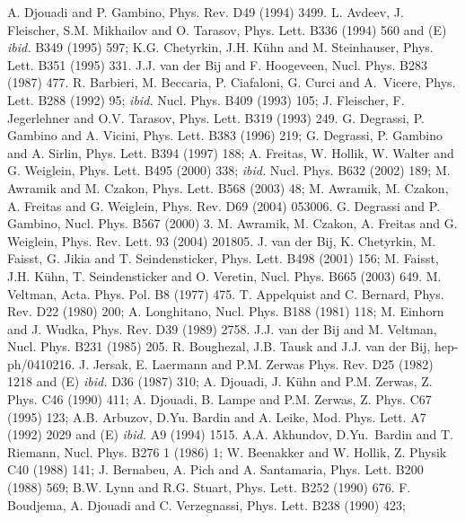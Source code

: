 \begin{thebibliography}{999}
A. Djouadi and P. Gambino, Phys. Rev. D49 (1994) 3499. 
%
 L. Avdeev, J. Fleischer, S.M. Mikhailov and 
O. Tarasov, Phys. Lett. B336 (1994) 560 and (E) {\it ibid.} B349 (1995) 597; 
K.G. Chetyrkin, J.H. K\"uhn and M. Steinhauser, Phys. Lett. B351 (1995) 331.
%
 J.J. van der Bij and F. Hoogeveen, Nucl. Phys. B283 
(1987) 477.
%
 R. Barbieri, M. Beccaria, P. Ciafaloni, G. Curci and 
A.~Vicere, Phys. Lett. B288 (1992) 95; {\it ibid.}  Nucl. Phys. B409 (1993) 
105; J. Fleischer, F. Jegerlehner and O.V. Tarasov, Phys. Lett. B319 (1993) 249. 
%
 G. Degrassi, P. Gambino and A. Vicini, Phys. Lett. B383 
(1996) 219; G. Degrassi, P. Gambino and A. Sirlin, Phys. Lett. B394 (1997) 188;
A. Freitas, W. Hollik, W. Walter and G. Weiglein, Phys. Lett. B495 (2000) 338;
{\it ibid.} Nucl. Phys. B632 (2002) 189; M. Awramik and M. Czakon, Phys. Lett. 
B568 (2003) 48; M. Awramik, M. Czakon, A. Freitas and G. Weiglein, Phys. Rev. 
D69 (2004) 053006.
%
 G. Degrassi and P. Gambino, Nucl. Phys. B567 (2000) 3.
%
 M. Awramik, M. Czakon, A. Freitas and G. Weiglein,
Phys. Rev. Lett. 93 (2004) 201805. 
%
 J. van der Bij, K. Chetyrkin, M. Faisst, G. Jikia and
T. Seindensticker, Phys. Lett. B498 (2001) 156; M. Faisst, J.H. K\"uhn, T. 
Seindensticker and O. Veretin, Nucl. Phys. B665 (2003) 649. 
%
 M. Veltman, Acta. Phys. Pol.  B8 (1977) 475.
%
T. Appelquist and C. Bernard,  Phys. Rev. D22 (1980) 200; 
A. Longhitano, Nucl. Phys. B188 (1981) 118; 
M. Einhorn and J. Wudka, Phys. Rev. D39 (1989) 2758.
%
 J.J. van der Bij and M. Veltman, Nucl. Phys. B231 
(1985) 205.
%
 R. Boughezal, J.B. Tausk and J.J. van der Bij,
hep-ph/0410216. 
%
 J. Jersak, E. Laermann and P.M. Zerwas
Phys. Rev. D25 (1982) 1218 and (E) {\it ibid.} D36 (1987) 310; 
A. Djouadi, J. K\"uhn and P.M. Zerwas, Z. Phys. C46 (1990) 411;
A. Djouadi, B. Lampe and P.M. Zerwas, Z. Phys. C67 (1995) 123;
A.B. Arbuzov, D.Yu. Bardin and A. Leike, Mod. Phys. Lett. A7 (1992) 2029
and (E) {\it ibid.} A9 (1994) 1515. 
%
A.A. Akhundov, D.Yu.\ Bardin and T. Riemann, Nucl. Phys. B276 1 (1986) 1;
W. Beenakker and W. Hollik, Z. Physik C40 (1988) 141;
J. Bernabeu, A. Pich and A. Santamaria, Phys. Lett. B200 (1988) 569;
B.W. Lynn and R.G. Stuart,  Phys. Lett. B252 (1990) 676. 
%
 F. Boudjema, A. Djouadi and C. Verzegnassi, 
Phys. Lett. B238 (1990) 423; 

\end{thebibliography}
